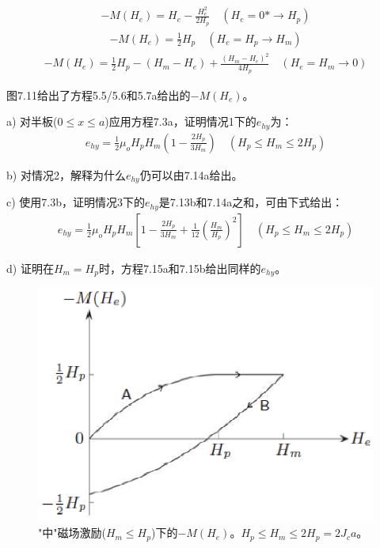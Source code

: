 \begin{align*}%
-M(H_e)=H_e-\frac{H_{e}^{2}}{2H_p}    \quad  (H_e=0*\rightarrow H_p) \tag{5.5}
\end{align*}
\begin{align*}
-M(H_e)=\frac{1}{2}H_p      \quad  (H_e=H_p\rightarrow H_m) \tag{5.6}
\end{align*}
\begin{align*}
-M(H_e)=\frac{1}{2}H_p-(H_m-H_e)+\frac{(H_m-H_e)^2}{4H_p} \quad   (H_e=H_m\rightarrow 0)\tag{5.7a}
\end{align*}

图7.11给出了方程5.5/5.6和5.7a给出的$−M(H_e)$。

a) 对半板($0\le x\le a$)应用方程7.3a，证明情况1下的$e_{hy}$为：
\begin{align*}%
e_{hy}=\frac{1}{2}\mu_oH_pH_m\left(1-\frac{2H_p}{3H_m}\right)\quad   (H_p\leq H_m\leq 2H_p)\tag{7.13b}
\end{align*}

b) 对情况2，解释为什么$e_{hy}$仍可以由7.14a给出。

c) 使用7.3b，证明情况3下的$e_{hy}$是7.13b和7.14a之和，可由下式给出：
\begin{align*}%
e_{hy}=\frac{1}{2}\mu_oH_pH_m\left[1-\frac{2H_p}{3H_m}+\frac{1}{12}\left(\frac{H_m}{H_p}\right)^2\right]     \quad (H_p\leq H_m \leq 2H_p) \tag{7.15b}
\end{align*}

d) 证明在$H_m=H_p$时，方程7.15a和7.15b给出同样的$e_{hy}$。

\begin{figure}[htbp]
	\centering
	\includegraphics[scale=0.7]{chpt7/figs/fig7.11.eps}
	\caption{"中"磁场激励($H_m\le H_p$)下的$-M(H_e)$。$H_p\le H_m\le 2H_p=2J_c a$。}
\end{figure}


